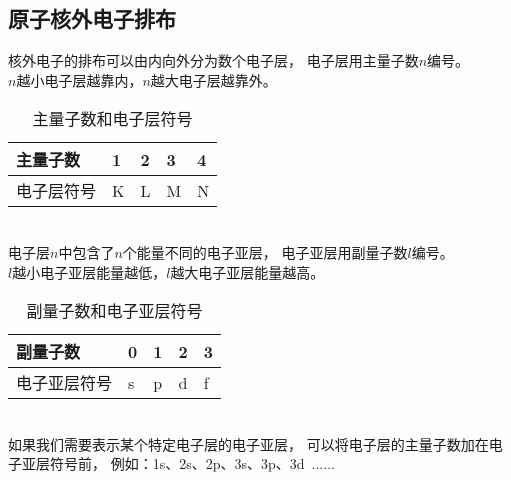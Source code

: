 \documentclass[UTF8]{ctexart}
\begin{document}
\subsection{原子核外电子排布}
    核外电子的排布可以由内向外分为数个电子层，
    电子层用主量子数$n$编号。\\[2mm]
    $n$越小电子层越靠内，$n$越大电子层越靠外。\vspace{5pt}
    \begin{table}[h]
        \begin{center}
            \begin{tabular}{l|l|l|l|l}
                \hline
                主量子数\qquad\qquad&1\qquad\qquad&2\qquad\qquad&3\qquad\qquad&4\qquad\qquad\\ \hline
                电子层符号&K&L&M&N\\ \hline
            \end{tabular}
            \caption{主量子数和电子层符号}
        \end{center}
    \end{table}\\
    电子层$n$中包含了$n$个能量不同的电子亚层，
    电子亚层用副量子数$l$编号。\\[2mm]
    $l$越小电子亚层能量越低，$l$越大电子亚层能量越高。\vspace{5pt}
    \begin{table}[h]
        \begin{center}
            \begin{tabular}{l|l|l|l|l}
                \hline
                副量子数\qquad\qquad&0\qquad\qquad&1\qquad\qquad&2\qquad\qquad&3\qquad\qquad\\ \hline
                电子亚层符号&s&p&d&f\\ \hline
            \end{tabular}
            \caption{副量子数和电子亚层符号}
        \end{center}        
    \end{table}\\
    如果我们需要表示某个特定电子层的电子亚层，
    可以将电子层的主量子数加在电子亚层符号前，
    例如：1s、2s、2p、3s、3p、3d~......
    
\newpage
\end{document}
